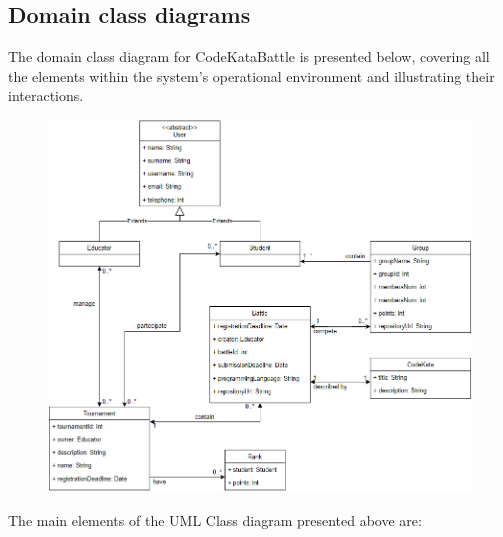 \documentclass[12pt, a4paper]{report}
\begin{document}
    \subsection{Domain class diagrams}
    The domain class diagram for CodeKataBattle is presented below, covering all the elements within the system's operational environment and illustrating their interactions.
    \begin{figure}[H]
        \centering
        \includegraphics[width=0.9\linewidth]{images/class.png}
    \end{figure}
    The main elements of the UML Class diagram presented above are: 
\end{document}
